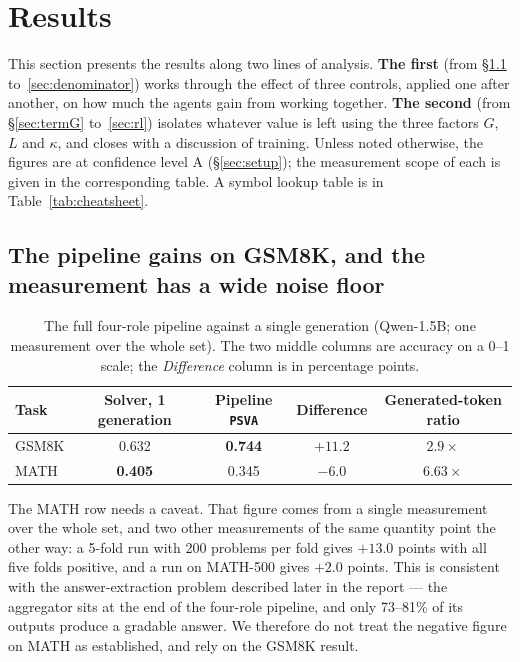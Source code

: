 \documentclass[11pt,a4paper]{article}
\begin{document}
\section{Results}\label{sec:results}

This section presents the results along two lines of analysis. \textbf{The first} (from \S\ref{sec:start} to~\ref{sec:denominator}) works through the effect of three controls, applied one after another, on how much the agents gain from working together. \textbf{The second} (from \S\ref{sec:termG} to~\ref{sec:rl}) isolates whatever value is left using the three factors $G$, $L$ and $\kappa$, and closes with a discussion of training. Unless noted otherwise, the figures are at confidence level A (\S\ref{sec:setup}); the measurement scope of each is given in the corresponding table. A symbol lookup table is in Table~\ref{tab:cheatsheet}.

\subsection{The pipeline gains on GSM8K, and the measurement has a wide noise floor}\label{sec:start}

\begin{table}[h]\centering\small
\begin{tabular}{@{}l c c c c@{}}
\toprule
Task & Solver, 1 generation & Pipeline \texttt{PSVA} & Difference & Generated-token ratio\\
\midrule
GSM8K & 0.632 & \textbf{0.744} & $+11.2$ & $2.9\times$\\
MATH  & \textbf{0.405} & 0.345 & $-6.0$ & $6.63\times$\\
\bottomrule
\end{tabular}
\caption{The full four-role pipeline against a single generation (Qwen-1.5B; one measurement over
the whole set). The two middle columns are accuracy on a 0--1 scale; the \emph{Difference} column is
in percentage points.}
\label{tab:pipeline}
\end{table}

The MATH row needs a caveat. That figure comes from a single measurement over the whole set, and two other measurements of the same quantity point the other way: a 5-fold run with 200 problems per fold gives $+13.0$ points with all five folds positive, and a run on MATH-500 gives $+2.0$ points. This is consistent with the answer-extraction problem described later in the report --- the aggregator sits at the end of the four-role pipeline, and only 73--81\% of its outputs produce a gradable answer. We therefore do not treat the negative figure on MATH as established, and rely on the GSM8K result.
\end{document}
